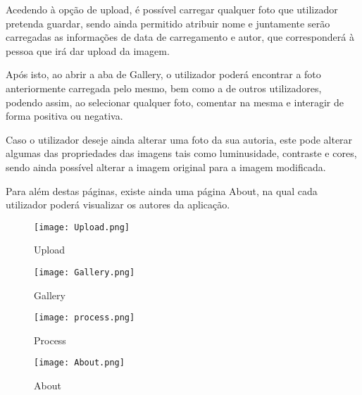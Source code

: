 \documentclass{report}
\begin{document}
Acedendo à opção de upload, é possível carregar qualquer foto que utilizador pretenda guardar, sendo ainda permitido atribuir nome e juntamente serão carregadas as informações de data de carregamento e autor, que corresponderá à pessoa que irá dar upload da imagem.

Após isto, ao abrir a aba de Gallery, o utilizador poderá encontrar a foto anteriormente carregada pelo mesmo, bem como a de outros utilizadores, podendo assim, ao selecionar qualquer foto, comentar na mesma e interagir de forma positiva ou negativa.

Caso o utilizador deseje ainda alterar uma foto da sua autoria, este pode alterar algumas das propriedades das imagens tais como luminusidade, contraste e cores, sendo ainda possível alterar a imagem original para a imagem modificada.

Para além destas páginas, existe ainda uma página About, na qual cada utilizador poderá visualizar os autores da aplicação.


\begin{figure}[h]
  \centering
  \begin{adjustbox}{center}
    \texttt{[image: Upload.png]}
  \end{adjustbox}
  \caption{Upload}
  \label{fig:singin}
\end{figure}


\begin{figure}[h]
  \centering
  \begin{adjustbox}{center}
    \texttt{[image: Gallery.png]}
  \end{adjustbox}
  \caption{Gallery}
  \label{fig:singin}
\end{figure}


\begin{figure}[h]
  \centering
  \begin{adjustbox}{center}
    \texttt{[image: process.png]}
  \end{adjustbox}
  \caption{Process}
  \label{fig:singin}
\end{figure}




\begin{figure}[h]
  \centering
  \begin{adjustbox}{center}
    \texttt{[image: About.png]}
  \end{adjustbox}
  \caption{About}
  \label{fig:singin}
\end{figure}
\end{document}
